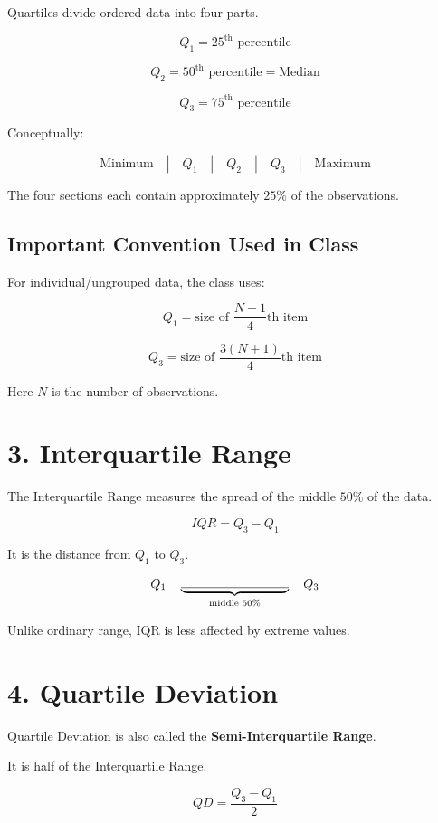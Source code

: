 \documentclass[12pt,a4paper]{article}
\newcommand{\boxformula}[1]{%
\[
\boxed{\displaystyle #1}
\]
}
\begin{document}
Quartiles divide ordered data into four parts.

\[
Q_1=25^{\text{th}}\text{ percentile}
\]

\[
Q_2=50^{\text{th}}\text{ percentile}=\text{Median}
\]

\[
Q_3=75^{\text{th}}\text{ percentile}
\]

Conceptually:

\[
\text{Minimum}
\quad|\quad
Q_1
\quad|\quad
Q_2
\quad|\quad
Q_3
\quad|\quad
\text{Maximum}
\]

The four sections each contain approximately $25\%$ of the observations.

\subsection*{Important Convention Used in Class}

For individual/ungrouped data, the class uses:

\boxformula{
Q_1=\text{size of }\frac{N+1}{4}\text{th item}
}

\boxformula{
Q_3=\text{size of }\frac{3(N+1)}{4}\text{th item}
}

Here $N$ is the number of observations.

\section{3. Interquartile Range}

The Interquartile Range measures the spread of the middle $50\%$ of the data.

\boxformula{IQR=Q_3-Q_1}

It is the distance from $Q_1$ to $Q_3$.

\[
Q_1
\quad\underbrace{\rule{3cm}{0.4pt}}_{\text{middle 50\%}}
\quad Q_3
\]

Unlike ordinary range, IQR is less affected by extreme values.

\section{4. Quartile Deviation}

Quartile Deviation is also called the \textbf{Semi-Interquartile Range}.

It is half of the Interquartile Range.

\boxformula{
QD=\frac{Q_3-Q_1}{2}
}
\end{document}
